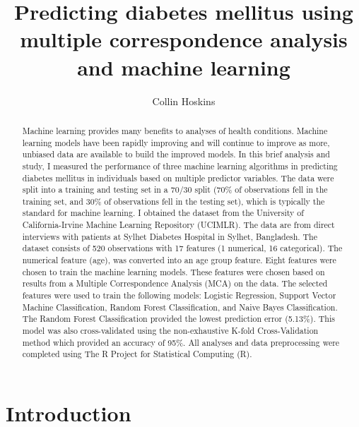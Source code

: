 \documentclass[
]{article}
\title{Predicting diabetes mellitus using multiple correspondence
analysis and machine learning}
\author{Collin Hoskins}
\date{}
\begin{document}
\maketitle
\begin{abstract}
Machine learning provides many benefits to analyses of health
conditions. Machine learning models have been rapidly improving and will
continue to improve as more, unbiased data are available to build the
improved models. In this brief analysis and study, I measured the
performance of three machine learning algorithms in predicting diabetes
mellitus in individuals based on multiple predictor variables. The data
were split into a training and testing set in a 70/30 split (70\% of
observations fell in the training set, and 30\% of observations fell in
the testing set), which is typically the standard for machine learning. I
obtained the dataset from the University of California-Irvine Machine
Learning Repository (UCIMLR). The data are from direct interviews with
patients at Sylhet Diabetes Hospital in Sylhet, Bangladesh. The dataset
consists of 520 observations with 17 features (1 numerical, 16
categorical). The numerical feature (age), was converted into an age
group feature. Eight features were chosen to train the machine learning
models. These features were chosen based on results from a Multiple
Correspondence Analysis (MCA) on the data. The selected features were
used to train the following models: Logistic Regression, Support Vector
Machine Classification, Random Forest Classification, and Naive Bayes
Classification. The Random Forest Classification provided the lowest
prediction error (5.13\%). This model was also cross-validated using the
non-exhaustive K-fold Cross-Validation method which provided an
accuracy of 95\%. All analyses and data preprocessing were completed
using The R Project for Statistical Computing (R).
\end{abstract}

\hypertarget{introduction}{%
\section{Introduction}\label{introduction}}
\end{document}
